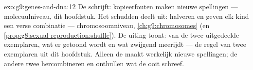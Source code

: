 \begin{solution}{exo:g9:genes-and-dna:12}
De  schrijft: kopieerfouten maken nieuwe spellingen ---
molecuulniveau, dit hoofdstuk. Het schudden deelt uit: halveren
en  geven elk kind een verse combinatie ---
chromosoomniveau, \cref{ch:g9:chromosomes} (en
\cref{prop:g8:sexual-reproduction:shuffle}). De uiting toont: van
de twee uitgedeelde exemplaren, wat er getoond wordt en wat
zwijgend meerijdt --- de regel van twee exemplaren uit dit
hoofdstuk. Alleen de  maakt werkelijk nieuwe spellingen;
de andere twee hercombineren en onthullen wat de  ooit
schreef.
\end{solution}

